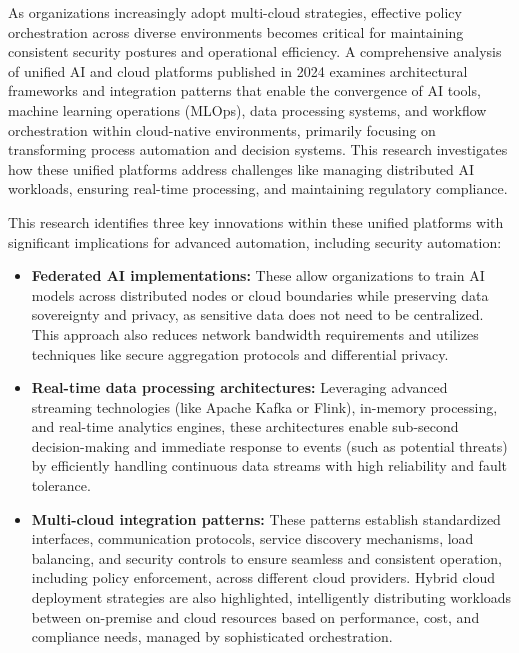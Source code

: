 As organizations increasingly adopt multi-cloud strategies, effective policy orchestration across diverse environments becomes critical for maintaining consistent security postures and operational efficiency\cite{sushil_prabhu_prabhakaran_integration_2024}. A comprehensive analysis of unified AI and cloud platforms published in 2024 examines architectural frameworks and integration patterns that enable the convergence of AI tools, machine learning operations (MLOps), data processing systems, and workflow orchestration within cloud-native environments, primarily focusing on transforming process automation and decision systems\cite{sushil_prabhu_prabhakaran_integration_2024}. This research investigates how these unified platforms address challenges like managing distributed AI workloads, ensuring real-time processing, and maintaining regulatory compliance\cite{sushil_prabhu_prabhakaran_integration_2024}.

This research identifies three key innovations within these unified platforms with significant implications for advanced automation, including security automation:
\begin{itemize}
    \item \textbf{Federated AI implementations:} These allow organizations to train AI models across distributed nodes or cloud boundaries while preserving data sovereignty and privacy, as sensitive data does not need to be centralized. This approach also reduces network bandwidth requirements and utilizes techniques like secure aggregation protocols and differential privacy\cite{sushil_prabhu_prabhakaran_integration_2024}.
    \item \textbf{Real-time data processing architectures:} Leveraging advanced streaming technologies (like Apache Kafka or Flink), in-memory processing, and real-time analytics engines, these architectures enable sub-second decision-making and immediate response to events (such as potential threats) by efficiently handling continuous data streams with high reliability and fault tolerance\cite{sushil_prabhu_prabhakaran_integration_2024}.
    \item \textbf{Multi-cloud integration patterns:} These patterns establish standardized interfaces, communication protocols, service discovery mechanisms, load balancing, and security controls to ensure seamless and consistent operation, including policy enforcement, across different cloud providers. Hybrid cloud deployment strategies are also highlighted, intelligently distributing workloads between on-premise and cloud resources based on performance, cost, and compliance needs, managed by sophisticated orchestration\cite{sushil_prabhu_prabhakaran_integration_2024}.
\end{itemize}

